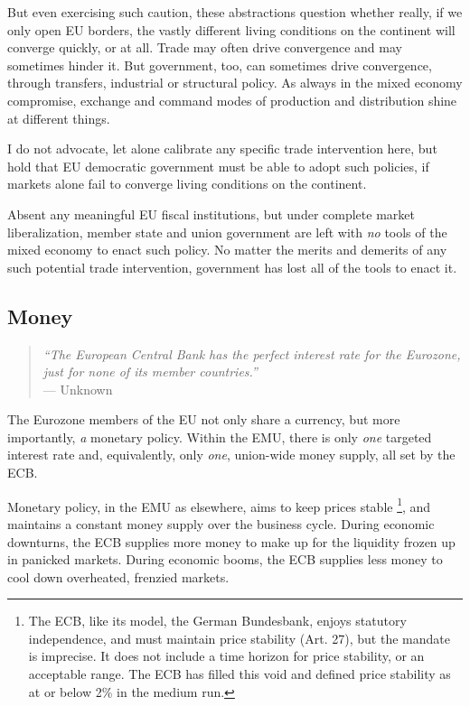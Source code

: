 \documentclass[11pt,a4paper,oneside]{article}
\begin{document}
But even exercising such caution, these abstractions question whether really, if we only open \gls{EU} borders, the vastly different living conditions on the continent will converge quickly, or at all.
Trade may often drive convergence and may sometimes hinder it.
But government, too, can sometimes drive convergence, through transfers, industrial or structural policy.
As always in the mixed economy compromise, exchange and command modes of production and distribution shine at different things.

I do not advocate, let alone calibrate any specific trade intervention here, but hold that \gls{EU} democratic government must be able to adopt such policies, if markets alone fail to converge living conditions on the continent.

Absent any meaningful \gls{EU} fiscal institutions, but under complete market liberalization, member state and union government are left with \emph{no} tools of the mixed economy to enact such policy.
No matter the merits and demerits of any such potential trade intervention, government has lost all of the tools to enact it.

\subsection{Money}

\begin{quote}
	\emph{``The European Central Bank has the perfect interest rate for the Eurozone, just for none of its member countries.''}\\
	--- Unknown
\end{quote}

The Eurozone members of the \gls{EU} not only share a currency, but more importantly, \emph{a} monetary policy.
Within the \gls{EMU}, there is only \emph{one} targeted interest rate and, equivalently, only \emph{one}, union-wide money supply, all set by the \gls{ECB}.

Monetary policy, in the \gls{EMU} as elsewhere, aims to keep prices stable\ignorespaces
\footnote{
	The \gls{ECB}, like its model, the German Bundesbank, enjoys statutory independence, and must maintain price stability (Art. 27), but the mandate is imprecise.
	It does not include a time horizon for price stability, or an acceptable range.
	The \gls{ECB} has filled this void and defined price stability as at or below 2\% in the medium run.
},
and maintains a constant money supply over the business cycle.
During economic downturns, the \gls{ECB} supplies more money to make up for the liquidity frozen up in panicked markets.
During economic booms, the \gls{ECB} supplies less money to cool down overheated, frenzied markets.
\end{document}
